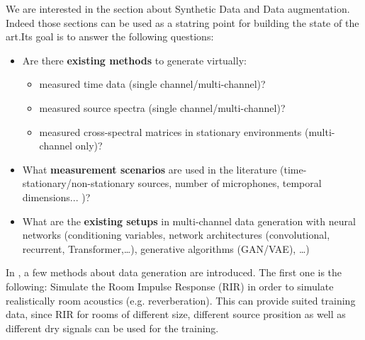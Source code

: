 \documentclass{article}
\begin{document}
We are interested in the section about Synthetic Data and Data augmentation. Indeed those sections can be used as a statring point for building the state of the art.Its goal is to answer the following questions:

\begin{itemize}
    \item Are there \textbf{existing methods} to generate virtually:
    \begin{itemize}
        \item measured time data (single channel/multi-channel)?
        \item measured source spectra (single channel/multi-channel)?
        \item measured cross-spectral matrices in stationary environments (multi-channel only)?
        
    \end{itemize}
    \item What \textbf{measurement scenarios} are used in the literature (time-stationary/non-stationary sources, number of microphones, temporal dimensions... )?
    \item What are the \textbf{existing setups} in multi-channel data generation with neural networks (conditioning variables, network architectures (convolutional, recurrent, Transformer,\dots), generative algorithms (GAN/VAE), \dots)
\end{itemize}

In \cite{grumiaux2022survey}, a few methods about data generation are introduced. The first one is the following: Simulate the Room Impulse Response (RIR) in order to simulate realistically room acoustics (e.g. reverberation). This can provide suited training data, since RIR for rooms of different size, different source prosition as well as different dry signals can be used for the training.

















 
\end{document}

